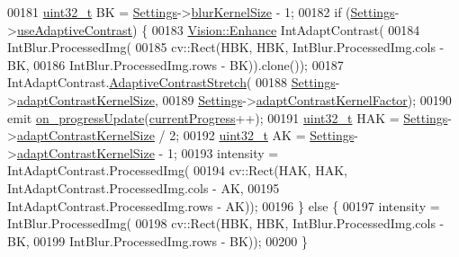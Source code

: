 \begin{DoxyCode}
00181     \hyperlink{_soil_math_types_8h_a435d1572bf3f880d55459d9805097f62}{uint32\_t} BK = \hyperlink{class_soil_analyzer_1_1_analyzer_a0a17b8f11ce60cd5b22d03b9925ee16e}{Settings}->\hyperlink{class_soil_analyzer_1_1_soil_settings_afa46542d30045e00fadbdd5a6ab9a1e1}{blurKernelSize} - 1;
00182     \textcolor{keywordflow}{if} (\hyperlink{class_soil_analyzer_1_1_analyzer_a0a17b8f11ce60cd5b22d03b9925ee16e}{Settings}->\hyperlink{class_soil_analyzer_1_1_soil_settings_a0e27335d05aed8f3f084744062368578}{useAdaptiveContrast}) \{
00183       \hyperlink{class_vision_1_1_enhance}{Vision::Enhance} IntAdaptContrast(
00184           IntBlur.ProcessedImg(
00185                       cv::Rect(HBK, HBK, IntBlur.ProcessedImg.cols - BK,
00186                                IntBlur.ProcessedImg.rows - BK)).clone());
00187       IntAdaptContrast.\hyperlink{class_vision_1_1_enhance_a7aa0dfb4808ffc7abddd7fe4e30f6601}{AdaptiveContrastStretch}(
00188           \hyperlink{class_soil_analyzer_1_1_analyzer_a0a17b8f11ce60cd5b22d03b9925ee16e}{Settings}->\hyperlink{class_soil_analyzer_1_1_soil_settings_a73f627b092dbdbda37b66ef6c2eef95c}{adaptContrastKernelSize},
00189           \hyperlink{class_soil_analyzer_1_1_analyzer_a0a17b8f11ce60cd5b22d03b9925ee16e}{Settings}->\hyperlink{class_soil_analyzer_1_1_soil_settings_ace12c0f4bc35d420ef528cc390fc2cdb}{adaptContrastKernelFactor});
00190       emit \hyperlink{class_soil_analyzer_1_1_analyzer_a808a8c21029471c4af0be996cb67d14c}{on\_progressUpdate}(\hyperlink{class_soil_analyzer_1_1_analyzer_a068a9d419064799836bb8caff60a2141}{currentProgress}++);
00191       \hyperlink{_soil_math_types_8h_a435d1572bf3f880d55459d9805097f62}{uint32\_t} HAK = \hyperlink{class_soil_analyzer_1_1_analyzer_a0a17b8f11ce60cd5b22d03b9925ee16e}{Settings}->\hyperlink{class_soil_analyzer_1_1_soil_settings_a73f627b092dbdbda37b66ef6c2eef95c}{adaptContrastKernelSize} / 2;
00192       \hyperlink{_soil_math_types_8h_a435d1572bf3f880d55459d9805097f62}{uint32\_t} AK = \hyperlink{class_soil_analyzer_1_1_analyzer_a0a17b8f11ce60cd5b22d03b9925ee16e}{Settings}->\hyperlink{class_soil_analyzer_1_1_soil_settings_a73f627b092dbdbda37b66ef6c2eef95c}{adaptContrastKernelSize} - 1;
00193       intensity = IntAdaptContrast.ProcessedImg(
00194           cv::Rect(HAK, HAK, IntAdaptContrast.ProcessedImg.cols - AK,
00195                    IntAdaptContrast.ProcessedImg.rows - AK));
00196     \} \textcolor{keywordflow}{else} \{
00197       intensity = IntBlur.ProcessedImg(
00198           cv::Rect(HBK, HBK, IntBlur.ProcessedImg.cols - BK,
00199                    IntBlur.ProcessedImg.rows - BK));
00200     \}

\end{DoxyCode}
